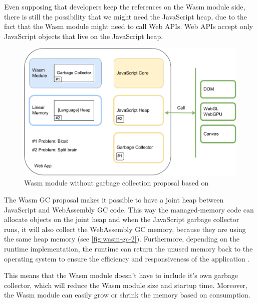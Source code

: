 Even supposing that developers keep the references on the Wasm module side, there is still the possibility that we might need the JavaScript heap, due to the fact that the Wasm module might need to call Web APIs. Web APIs accept only JavaScript objects that live on the JavaScript heap. 
%
\begin{figure}[htbp]
  \centering
      \includegraphics[width=1\linewidth]{images/wasm/wasm_gc_1.drawio.pdf}
  \caption{Wasm module without garbage collection proposal based on \cite{sekhar_2023_mobile}}
  \label{fig:wasm-gc-1}
\end{figure}
%
The Wasm GC proposal makes it possible to have a joint heap between JavaScript and WebAssembly GC code. This way the managed-memory code can allocate objects on the joint heap and when the JavaScript garbage collector runs, it will also collect the WebAssembly GC memory, because they are using the same heap memory (see \autoref{fig:wasm-gc-2}). Furthermore, depending on the runtime implementation, the runtime can return the unused memory back to the operating system to ensure the efficiency and responsiveness of the application \cite{sekhar_2023_mobile}. 

This means that the Wasm module doesn't have to include it's own garbage collector, which will reduce the Wasm module size and startup time. Moreover, the Wasm module can easily grow or shrink the memory based on consumption. 


